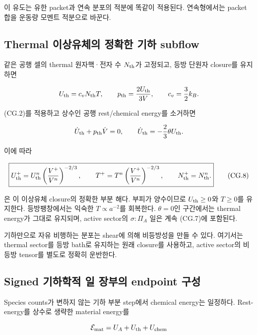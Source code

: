 \documentclass[11pt,a4paper]{article}
\begin{document}
이 유도는 유한 packet과 연속 분포의 적분에 똑같이 적용된다. 연속형에서는 packet 합을 운동량 모멘트 적분으로 바꾼다.

\hypertarget{thermal-uxc774uxc0c1uxc720uxccb4uxc758-uxc815uxd655uxd55c-uxae30uxd558-subflow}{%
\subsection{Thermal 이상유체의 정확한 기하 subflow}\label{thermal-uxc774uxc0c1uxc720uxccb4uxc758-uxc815uxd655uxd55c-uxae30uxd558-subflow}}

같은 공행 셀의 thermal 원자핵·전자 수 \(N_{\rm th}\)가 고정되고, 등방 단원자 closure를 유지하면

\[
U_{\rm th}=c_vN_{\rm th}T,\qquad
p_{\rm th}=\frac{2U_{\rm th}}{3V},\qquad c_v=\frac32k_B.
\]

(CG.2)를 적용하고 상수인 공행 rest/chemical energy를 소거하면

\[
\dot U_{\rm th}+p_{\rm th}\dot V=0,
\qquad
\dot U_{\rm th}=-\frac23\theta U_{\rm th}.
\]

이에 따라

\[
\boxed{
U_{\rm th}^{+}
=U_{\rm th}^{n}
\left(\frac{V^{+}}{V^n}\right)^{-2/3},
\qquad
T^{+}=T^n
\left(\frac{V^{+}}{V^n}\right)^{-2/3},
\qquad N_{\rm th}^{+}=N_{\rm th}^{n}.
}
\tag{CG.8}
\]

은 이 이상유체 closure의 정확한 부분 해다. 부피가 양수이므로 \(U_{\rm th}\ge0\)와 \(T\ge0\)를 유지한다. 등방팽창에서는 익숙한 \(T\propto a^{-2}\)를 회복한다. \(\theta=0\)인 구간에서는 thermal energy가 그대로 유지되며, active sector의 \(\sigma:\Pi_A\) 일은 계속 (CG.7)에 포함된다.

기하만으로 자유 비행하는 분포는 shear에 의해 비등방성을 만들 수 있다. 여기서는 thermal sector를 등방 bath로 유지하는 원래 closure를 사용하고, active sector의 비등방 tensor를 별도로 정확히 운반한다.

\hypertarget{signed-uxae30uxd558uxd559uxc801-uxc77c-uxc7a5uxbd80uxc758-endpoint-uxad6cuxc131}{%
\subsection{Signed 기하학적 일 장부의 endpoint 구성}\label{signed-uxae30uxd558uxd559uxc801-uxc77c-uxc7a5uxbd80uxc758-endpoint-uxad6cuxc131}}

Species counts가 변하지 않는 기하 부분 step에서 chemical energy는 일정하다. Rest-energy를 상수로 생략한 material energy를

\[
\mathcal E_{\rm mat}=U_A+U_{\rm th}+U_{\rm chem}
\]
\end{document}
